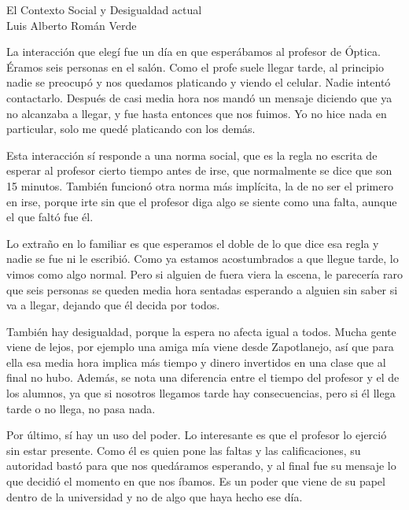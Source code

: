 \documentclass[12pt,letterpaper]{article}
\newcommand{\titulo}[1]{\vspace{6pt}{\LARGE #1}\par\vspace{4pt}}
\begin{document}
\begin{center}{\LARGE El Contexto Social y Desigualdad actual}\\[8pt]{\large Luis Alberto Román Verde}\end{center}\vspace{6pt}

\titulo{Análisis de una interacción social}

La interacción que elegí fue un día en que esperábamos al profesor de Óptica. Éramos seis personas en el salón. Como el profe suele llegar tarde, al principio nadie se preocupó y nos quedamos platicando y viendo el celular. Nadie intentó contactarlo. Después de casi media hora nos mandó un mensaje diciendo que ya no alcanzaba a llegar, y fue hasta entonces que nos fuimos. Yo no hice nada en particular, solo me quedé platicando con los demás.

Esta interacción sí responde a una norma social, que es la regla no escrita de esperar al profesor cierto tiempo antes de irse, que normalmente se dice que son 15 minutos. También funcionó otra norma más implícita, la de no ser el primero en irse, porque irte sin que el profesor diga algo se siente como una falta, aunque el que faltó fue él.

Lo extraño en lo familiar es que esperamos el doble de lo que dice esa regla y nadie se fue ni le escribió. Como ya estamos acostumbrados a que llegue tarde, lo vimos como algo normal. Pero si alguien de fuera viera la escena, le parecería raro que seis personas se queden media hora sentadas esperando a alguien sin saber si va a llegar, dejando que él decida por todos.

También hay desigualdad, porque la espera no afecta igual a todos. Mucha gente viene de lejos, por ejemplo una amiga mía viene desde Zapotlanejo, así que para ella esa media hora implica más tiempo y dinero invertidos en una clase que al final no hubo. Además, se nota una diferencia entre el tiempo del profesor y el de los alumnos, ya que si nosotros llegamos tarde hay consecuencias, pero si él llega tarde o no llega, no pasa nada.

Por último, sí hay un uso del poder. Lo interesante es que el profesor lo ejerció sin estar presente. Como él es quien pone las faltas y las calificaciones, su autoridad bastó para que nos quedáramos esperando, y al final fue su mensaje lo que decidió el momento en que nos íbamos. Es un poder que viene de su papel dentro de la universidad y no de algo que haya hecho ese día.

\newpage
\titulo{Mi ubicación social}
\end{document}

